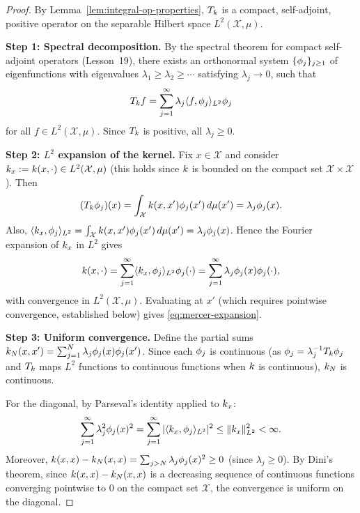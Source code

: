 \documentclass[11pt,a4paper]{article}
\begin{document}
\begin{proof}
By Lemma~\ref{lem:integral-op-properties}, $T_k$ is a
compact, self-adjoint, positive operator on the separable Hilbert
space $L^2(\mathcal{X}, \mu)$.

\textbf{Step 1: Spectral decomposition.} By the spectral theorem
for compact self-adjoint operators (Lesson~19), there exists an
orthonormal system $\{\phi_j\}_{j \ge 1}$ of eigenfunctions
with eigenvalues $\lambda_1 \ge \lambda_2 \ge \cdots$ satisfying
$\lambda_j \to 0$, such that
\[
T_k f = \sum_{j=1}^\infty \lambda_j \langle f, \phi_j
\rangle_{L^2} \phi_j
\]
for all $f \in L^2(\mathcal{X}, \mu)$. Since $T_k$ is
positive, all $\lambda_j \ge 0$.

\textbf{Step 2: $L^2$ expansion of the kernel.} Fix $x \in
\mathcal{X}$ and consider $k_x := k(x, \cdot) \in
L^2(\mathcal{X}, \mu)$ (this holds since $k$ is bounded
on the compact set $\mathcal{X} \times \mathcal{X}$). Then
\[
(T_k \phi_j)(x) = \int_{\mathcal{X}} k(x, x')
\phi_j(x') \, d\mu(x') = \lambda_j \phi_j(x).
\]
Also, $\langle k_x, \phi_j \rangle_{L^2} =
\int_{\mathcal{X}} k(x, x') \phi_j(x') \, d\mu(x')
= \lambda_j \phi_j(x)$. Hence the Fourier expansion of
$k_x$ in $L^2$ gives
\[
k(x, \cdot) = \sum_{j=1}^\infty \langle k_x,
\phi_j \rangle_{L^2} \phi_j(\cdot)
= \sum_{j=1}^\infty \lambda_j \phi_j(x) \phi_j(\cdot),
\]
with convergence in $L^2(\mathcal{X}, \mu)$. Evaluating at $x'$
(which requires pointwise convergence, established below) gives
\eqref{eq:mercer-expansion}.

\textbf{Step 3: Uniform convergence.} Define the partial sums
$k_N(x, x') = \sum_{j=1}^N \lambda_j \phi_j(x)
\phi_j(x')$. Since each $\phi_j$ is continuous (as
$\phi_j = \lambda_j^{-1} T_k \phi_j$ and $T_k$
maps $L^2$ functions to continuous functions when $k$ is
continuous), $k_N$ is continuous.

For the diagonal, by Parseval's identity applied to $k_x$:
\[
\sum_{j=1}^\infty \lambda_j^2 \phi_j(x)^2
= \sum_{j=1}^\infty |\langle k_x, \phi_j \rangle_{L^2}|^2
\le \|k_x\|_{L^2}^2 < \infty.
\]
Moreover, $k(x, x) - k_N(x, x) = \sum_{j > N}
\lambda_j \phi_j(x)^2 \ge 0$ (since $\lambda_j \ge 0$).
By Dini's theorem, since $k(x,x) - k_N(x,x)$ is a
decreasing sequence of continuous functions converging pointwise
to $0$ on the compact set $\mathcal{X}$, the convergence is
uniform on the diagonal.


\end{proof}
\end{document}
